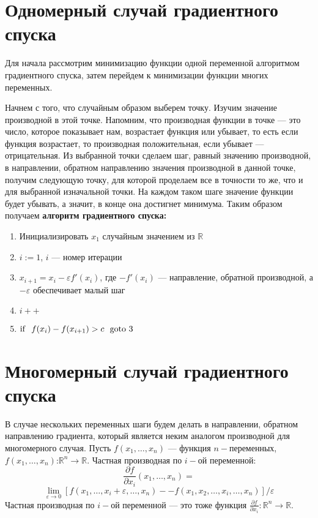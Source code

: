 \documentclass[14pt]{extreport}
\begin{document}
    \section{Одномерный случай градиентного спуска}
        Для начала рассмотрим минимизацию функции одной переменной алгоритмом градиентного спуска, затем перейдем к минимизации функции многих переменных.

        Начнем с того, что случайным образом выберем точку. Изучим значение производной в этой точке. Напомним, что производная функции в точке --- это число, которое показывает нам, возрастает функция или убывает, то есть если функция возрастает, то производная положительная, если убывает --- отрицательная.
        Из выбранной точки сделаем шаг, равный значению производной, в направлении, обратном направлению значения производной в данной точке, получим следующую точку, для которой проделаем все в точности то же, что и для выбранной изначальной точки. На каждом таком шаге значение функции будет убывать, а значит, в конце она достигнет минимума. Таким образом получаем \textbf{алгоритм градиентного спуска:}
        \begin{enumerate}
         \item Инициализировать $x_1$ случайным значением из $\mathbb{R}$
         \item $i:=1$, $i$ --- номер итерации
         \item $x_{i+1}=x_i-\varepsilon f'(x_i)$, где $-f'(x_i)$ --- направление, обратной производной, а $-\varepsilon$ обеспечивает малый шаг
         \item $i++$
         \item ${\rm if}\ \ f(x_{i})-f(x_{i+1}) >c\ \ {\rm goto}\ 3$
        \end{enumerate}

    \section{Многомерный случай градиентного спуска}
        В случае нескольких переменных шаги будем делать в направлении, обратном направлению градиента, который является неким аналогом производной для многомерного случая.
        Пусть $f(x_1, \ldots, x_n)$ --- функция $n-$переменных, $f(x_1, \ldots, x_n)$:$\mathbb{R}^n\rightarrow \mathbb{R}$.
        Частная производная по $i-$ой переменной: $$\frac{\partial f}{\partial x_i}(x_1, \ldots, x_n) = $$
        $$\lim_{\varepsilon \to  0}[f(x_1, \ldots, x_i + \varepsilon, \ldots, x_n) -- f(x_1, x_2, \ldots, x_i, \ldots, x_n)]/ \varepsilon$$
        Частная производная по $i-$ой переменной --- это тоже функция $\frac{\partial f}{\partial x_i}: \mathbb{R}^n\rightarrow \mathbb{R}$.
\end{document}
